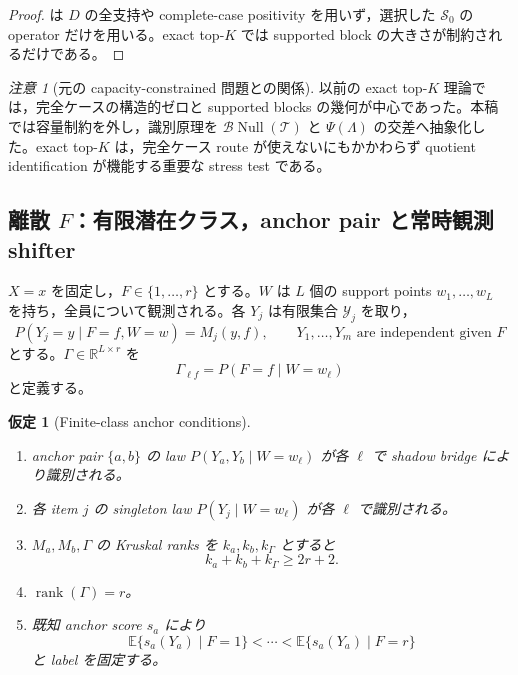 \documentclass[11pt,a4paper]{ltjsarticle}
\newtheorem{assumption}{仮定}[section]
\theoremstyle{remark}
\newtheorem{remark}{注意}[section]
\newcommand{\E}{\mathbb E}
\newcommand{\R}{\mathbb R}
\newcommand{\cS}{\mathcal S}
\newcommand{\cY}{\mathcal Y}
\newcommand{\Top}{\mathscr T}
\newcommand{\Bop}{\mathscr B}
\newcommand{\Null}{\operatorname{Null}}
\newcommand{\rank}{\operatorname{rank}}
\begin{document}
\begin{proof}
は $D$ の全支持や complete-case positivity を用いず，選択した $\cS_0$ の operator だけを用いる。exact top-$K$ では supported block の大きさが制約されるだけである。
\end{proof}

\begin{remark}[元の capacity-constrained 問題との関係]
以前の exact top-$K$ 理論では，完全ケースの構造的ゼロと supported blocks の幾何が中心であった。本稿では容量制約を外し，識別原理を $\Bop\Null(\Top)$ と $\Psi(\Lambda)$ の交差へ抽象化した。exact top-$K$ は，完全ケース route が使えないにもかかわらず quotient identification が機能する重要な stress test である。
\end{remark}

\subsection{離散 \texorpdfstring{$F$}{F}：有限潜在クラス，anchor pair と常時観測 shifter}
$X=x$ を固定し，$F\in\{1,\ldots,r\}$ とする。$W$ は $L$ 個の support points $w_1,\ldots,w_L$ を持ち，全員について観測される。各 $Y_j$ は有限集合 $\cY_j$ を取り，
\begin{equation}
P(Y_j=y\mid F=f,W=w)=M_j(y,f),
\qquad
Y_1,\ldots,Y_m\text{ are independent given }F
\label{eq:latentclass}
\end{equation}
とする。$\Gamma\in\R^{L\times r}$ を
\[
\Gamma_{\ell f}=P(F=f\mid W=w_\ell)
\]
と定義する。

\begin{assumption}[Finite-class anchor conditions]\label{as:finiteanchor}
\begin{enumerate}[label=(FC\arabic*)]
\item anchor pair $\{a,b\}$ の law $P(Y_a,Y_b\mid W=w_\ell)$ が各 $\ell$ で shadow bridge により識別される。
\item 各 item $j$ の singleton law $P(Y_j\mid W=w_\ell)$ が各 $\ell$ で識別される。
\item $M_a,M_b,\Gamma$ の Kruskal ranks を $k_a,k_b,k_\Gamma$ とすると
\begin{equation}
 k_a+k_b+k_\Gamma\ge2r+2.
\label{eq:kruskal}
\end{equation}
\item $\rank(\Gamma)=r$。
\item 既知 anchor score $s_a$ により
\[
\E\{s_a(Y_a)\mid F=1\}<\cdots<\E\{s_a(Y_a)\mid F=r\}
\]
と label を固定する。
\end{enumerate}
\end{assumption}
\end{document}
